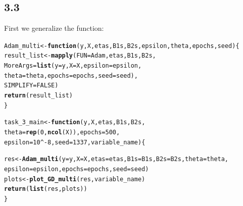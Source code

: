 \documentclass[11pt, a4paper, english]{article}\usepackage[]{graphicx}\usepackage[dvipsnames]{xcolor}
\makeatletter
\newcommand{\hlnum}[1]{\textcolor[rgb]{0.686,0.059,0.569}{#1}}%
\newcommand{\hlopt}[1]{\textcolor[rgb]{0,0,0}{#1}}%
\newcommand{\hlstd}[1]{\textcolor[rgb]{0.345,0.345,0.345}{#1}}%
\newcommand{\hlkwa}[1]{\textcolor[rgb]{0.161,0.373,0.58}{\textbf{#1}}}%
\newcommand{\hlkwb}[1]{\textcolor[rgb]{0.69,0.353,0.396}{#1}}%
\newcommand{\hlkwc}[1]{\textcolor[rgb]{0.333,0.667,0.333}{#1}}%
\newcommand{\hlkwd}[1]{\textcolor[rgb]{0.737,0.353,0.396}{\textbf{#1}}}%
\newenvironment{kframe}{%
 \def\at@end@of@kframe{}%
 \ifinner\ifhmode%
  \def\at@end@of@kframe{\end{minipage}}%
  \begin{minipage}{\columnwidth}%
 \fi\fi%
 \def\FrameCommand##1{\hskip\@totalleftmargin \hskip-\fboxsep
 \colorbox{shadecolor}{##1}\hskip-\fboxsep
     \hskip-\linewidth \hskip-\@totalleftmargin \hskip\columnwidth}%
 \MakeFramed {\advance\hsize-\width
   \@totalleftmargin\z@ \linewidth\hsize
   \@setminipage}}%
 {\par\unskip\endMakeFramed%
 \at@end@of@kframe}
\newenvironment{knitrout}{}{} %
\makeatother
\begin{document}
\subsection{3.3}
First we generalize the function:
\begin{knitrout}
\color{fgcolor}\begin{kframe}
\begin{alltt}
\hlstd{Adam_multi} \hlkwb{<-} \hlkwa{function}\hlstd{(}\hlkwc{y}\hlstd{,} \hlkwc{X}\hlstd{,} \hlkwc{etas}\hlstd{,} \hlkwc{B1s}\hlstd{,} \hlkwc{B2s}\hlstd{,} \hlkwc{epsilon}\hlstd{,} \hlkwc{theta}\hlstd{,} \hlkwc{epochs}\hlstd{,} \hlkwc{seed}\hlstd{)\{}
  \hlstd{result_list} \hlkwb{<-} \hlkwd{mapply}\hlstd{(}\hlkwc{FUN} \hlstd{= Adam, etas, B1s, B2s,}
         \hlkwc{MoreArgs} \hlstd{=} \hlkwd{list}\hlstd{(}\hlkwc{y} \hlstd{= y,} \hlkwc{X} \hlstd{= X,} \hlkwc{epsilon} \hlstd{= epsilon,}
                         \hlkwc{theta} \hlstd{= theta,} \hlkwc{epochs} \hlstd{= epochs,} \hlkwc{seed} \hlstd{= seed),}
         \hlkwc{SIMPLIFY} \hlstd{=} \hlnum{FALSE}\hlstd{)}
  \hlkwd{return}\hlstd{(result_list)}
\hlstd{\}}


\hlstd{task_3_main} \hlkwb{<-} \hlkwa{function}\hlstd{(}\hlkwc{y}\hlstd{,} \hlkwc{X}\hlstd{,} \hlkwc{etas}\hlstd{,} \hlkwc{B1s}\hlstd{,} \hlkwc{B2s}\hlstd{,}
                        \hlkwc{theta} \hlstd{=} \hlkwd{rep}\hlstd{(}\hlnum{0}\hlstd{,} \hlkwd{ncol}\hlstd{(X)),} \hlkwc{epochs} \hlstd{=} \hlnum{500}\hlstd{,}
                        \hlkwc{epsilon}\hlstd{=} \hlnum{10}\hlopt{^-}\hlnum{8}\hlstd{,} \hlkwc{seed}\hlstd{=}\hlnum{1337}\hlstd{,} \hlkwc{variable_name}\hlstd{)\{}

 \hlstd{res} \hlkwb{<-}  \hlkwd{Adam_multi}\hlstd{(}\hlkwc{y}\hlstd{=y,} \hlkwc{X}\hlstd{=X,} \hlkwc{etas} \hlstd{= etas,} \hlkwc{B1s} \hlstd{= B1s,} \hlkwc{B2s} \hlstd{= B2s,}\hlkwc{theta} \hlstd{= theta,}
             \hlkwc{epsilon} \hlstd{= epsilon,} \hlkwc{epochs}\hlstd{=epochs,} \hlkwc{seed}\hlstd{=seed)}
 \hlstd{plots} \hlkwb{<-} \hlkwd{plot_GD_multi}\hlstd{(res, variable_name)}
 \hlkwd{return}\hlstd{(}\hlkwd{list}\hlstd{(res, plots))}
\hlstd{\}}
\end{alltt}
\end{kframe}
\end{knitrout}
\end{document}
